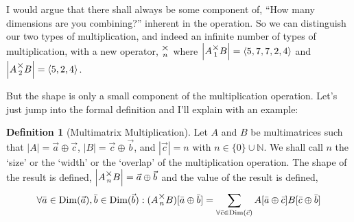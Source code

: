 \documentclass[12pt]{book}
\theoremstyle{plain}
\theoremstyle{definition}
\newtheorem{definition}{Definition}[chapter]
\theoremstyle{ppart}
\theoremstyle{case}
\theoremstyle{solution}
\DeclareMathOperator{\Dim}{Dim}
\newcommand{\mmult}[1]{\text{\raisebox{1ex}{$\underset{#1}{\times}$}}}
\newcommand{\shape}[1]{\left|#1\right|}
\begin{document}
I would argue that there shall always be some component of, 
``How many dimensions are you combining?'' inherent
in the operation. So we can distinguish our two types of multiplication, and indeed
an infinite number of types of multiplication, with a new operator, $\mmult{n}$ where
$\shape{A \mmult{1} B} = \left<5, 7, 7, 2, 4\right>$ and 
$\shape{A \mmult{2} B} = \left<5, 2, 4\right>$.

But the shape is only a small component of the multiplication  operation. Let's
just jump into the formal definition and I'll explain with an example:

\begin{definition}[Multimatrix Multiplication]
\label{mm_mult}
Let $A$ and $B$ be multimatrices such that $\shape{A} = \vec{a} \oplus \vec{c}$,
$\shape{B} = \vec{c} \oplus \vec{b}$, and $\shape{\vec{c}} = n$ with
$n \in \{0\} \cup \mathbb{N}$. We shall call $n$ the `size' or the `width'
or the `overlap' of the multiplication operation.
The shape of the result is defined, $\shape{A \mmult{n} B} = \vec{a} \oplus \vec{b}$
and the value of the result is defined,
\[
\forall \bar{a} \in \Dim(\vec{a}), \bar{b} \in \Dim(\vec{b}):
(A \mmult{n}  B)[\bar{a} \oplus \bar{b}] =
\sum_{\forall \bar{c} \in \Dim(\vec{c})}
  A[\bar{a} \oplus \bar{c}] B[\bar{c} \oplus \bar{b}]
\]
\end{definition}
\end{document}
